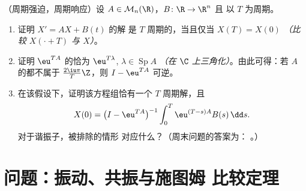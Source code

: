 \begin{exercise}[$\star\star\star$]\label{exo:b2:diffeq:12}
（周期强迫，周期响应）设 $A \in
\mathcal{M}_n(\R)$，$B \colon \R \to \R^n$ 且
以 $T$ 为周期。
\begin{enumerate}
  \item 证明 $X' = AX + B(t)$ 的解
        是 $T$ 周期的，当且仅当 $X(T) = X(0)$
        \emph{（比较 $X(\cdot + T)$ 与 $X$）}。
  \item 证明 $\eu^{TA}$ 的恰为
        $\eu^{T\lambda}$, $\lambda \in \operatorname{Sp}A$
        \emph{（在 $\C$ 上三角化）}。由此可得：若
        $A$ 的都不属于 $\frac{2\iu\pi}{T}\Z$，则
        $I - \eu^{TA}$ 可逆。
  \item 在该假设下，证明该方程组恰有一个
        $T$ 周期解，且
        \[
        X(0) = \bigl(I - \eu^{TA}\bigr)^{-1}
        \int_0^{T}\eu^{(T-s)A}B(s)\,\dd s .
        \]
        对于谐振子，被排除的情形
        对应什么？（周末问题的答案为：
        。）
\end{enumerate}
\end{exercise}

\section{问题：振动、共振与施图姆
比较定理}

